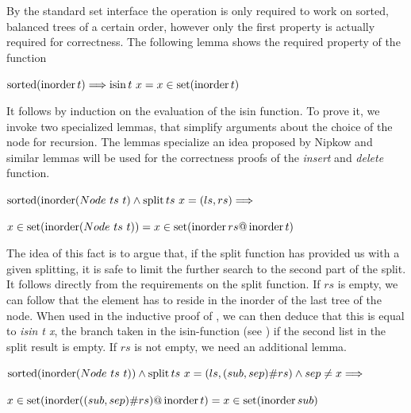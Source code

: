 By the standard set interface the operation is only required to work on
sorted, balanced trees of a certain order, however only the first property
is actually required for correctness.
The following lemma shows the required property of the function

\begin{theorem}
    \label{thm:isin-set}
    $\operatorname{sorted} (\operatorname{inorder} t) \Longrightarrow \operatorname{isin} t\ x = x \in \operatorname{set} (\operatorname{inorder} t)$
\end{theorem}

It follows by induction on the evaluation of the isin function.
To prove it, we invoke two specialized lemmas,
that simplify arguments about the choice of the node for recursion.
The lemmas specialize an idea proposed by Nipkow \parencite{DBLP:conf/itp/Nipkow16}
and similar lemmas will be used for the correctness proofs of 
the \textit{insert} and \textit{delete} function.

\begin{lemma} $\operatorname{sorted} (\operatorname{inorder} (Node\ ts\ t) \wedge \operatorname{split} ts\ x = (ls, rs) \Longrightarrow$ \\
    \begin{center}
    $x \in \operatorname{set} (\operatorname{inorder} (Node\ ts\ t)) = x \in \operatorname{set} (\operatorname{inorder} rs @ \operatorname{inorder} t)$
    \end{center}
\end{lemma}

The idea of this fact is to argue that, if the split function has provided
us with a given splitting, it is safe to limit the further search
to the second part of the split.
It follows directly from the requirements on the split function.
If $rs$ is empty, we can follow that the element has to reside in the inorder
of the last tree of the node.
When used in the inductive proof of , we can then deduce that this is
equal to \textit{isin t x}, the branch taken in the isin-function
(see ) if the second list in the split result is empty.
If $rs$ is not empty, we need an additional lemma.

\begin{lemma}
    $\operatorname{sorted} (\operatorname{inorder} (Node\ ts\ t)) \wedge \operatorname{split} ts\ x = (ls, (sub,sep)\#rs) \wedge sep \neq x \Longrightarrow$ \\
    \begin{center}
    $x \in \operatorname{set} (\operatorname{inorder} ((sub,sep)\#rs) @ \operatorname{inorder} t) = x \in \operatorname{set} (\operatorname{inorder} sub)$
    \end{center}
\end{lemma}

